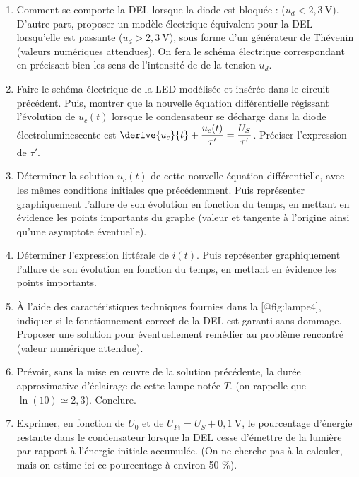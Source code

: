 \begin{enumerate}
\def\labelenumi{\arabic{enumi}.}
\setcounter{enumi}{3}
\item
  Comment se comporte la DEL lorsque la diode est bloquée :
  (\(u_d < 2,3\ \mathrm{V}\)). D'autre part, proposer un modèle
  électrique équivalent pour la DEL lorsqu'elle est passante
  (\(u_d > 2,3\ \mathrm{V}\)), sous forme d'un générateur de Thévenin
  (valeurs numériques attendues). On fera le schéma électrique
  correspondant en précisant bien les sens de l'intensité de de la
  tension \(u_d\).
\item
  Faire le schéma électrique de la LED modélisée et insérée dans le
  circuit précédent. Puis, montrer que la nouvelle équation
  différentielle régissant l'évolution de \(u_c(t)\) lorsque le
  condensateur se décharge dans la diode électroluminescente est
  \(\derive{u_c}{t} + \dfrac{u_c(t)}{\tau'} = \dfrac{U_S}{\tau'}\).
  Préciser l'expression de \(\tau'\).
\item
  Déterminer la solution \(u_c(t)\) de cette nouvelle équation
  différentielle, avec les mêmes conditions initiales que précédemment.
  Puis représenter graphiquement l'allure de son évolution en fonction
  du temps, en mettant en évidence les points importants du graphe
  (valeur et tangente à l'origine ainsi qu'une asymptote éventuelle).
\item
  Déterminer l'expression littérale de \(i(t)\). Puis représenter
  graphiquement l'allure de son évolution en fonction du temps, en
  mettant en évidence les points importants.
\item
  À l'aide des caractéristiques techniques fournies dans la
  {[}@fig:lampe4{]}, indiquer si le fonctionnement correct de la DEL est
  garanti sans dommage. Proposer une solution pour éventuellement
  remédier au problème rencontré (valeur numérique attendue).
\item
  Prévoir, sans la mise en œuvre de la solution précédente, la durée
  approximative d'éclairage de cette lampe notée \(T\). (on rappelle que
  \(\ln(10) \simeq 2,3\)). Conclure.
\item
  Exprimer, en fonction de \(U_0\) et de
  \(U_{Fi} = U_S + 0,1\ \mathrm{V}\), le pourcentage d'énergie restante
  dans le condensateur lorsque la DEL cesse d'émettre de la lumière par
  rapport à l'énergie initiale accumulée. (On ne cherche pas à la
  calculer, mais on estime ici ce pourcentage à environ 50 \%).
\end{enumerate}

\newpage

